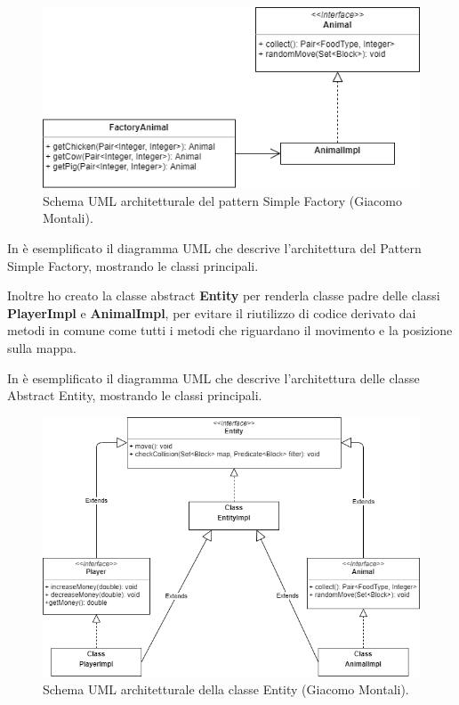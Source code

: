 \documentclass[a4paper,12pt]{report}
\begin{document}
\begin{figure}[!htb]
	\centering{}
	\includegraphics[width=\textwidth]{img/UML_FactoryMonta.png}
	\caption{Schema UML architetturale del pattern Simple Factory (Giacomo Montali).}
	\label{img:GiacomoMontali_Factory}
\end{figure}

In  è esemplificato il diagramma UML che descrive l'architettura del Pattern Simple Factory, mostrando le classi principali.

Inoltre ho creato la classe abstract \textbf{Entity} per renderla classe padre delle classi \textbf{PlayerImpl} e \textbf{AnimalImpl}, per evitare il riutilizzo di codice derivato dai metodi in comune come tutti i metodi che riguardano il movimento e la posizione sulla mappa.

In  è esemplificato il diagramma UML che descrive l'architettura delle classe Abstract Entity, mostrando le classi principali.

\hfill\break
\begin{figure}[!htb]
	\centering{}
	\includegraphics[width=\textwidth]{img/UML_AbstractMonta.png}
	\caption{Schema UML architetturale della classe Entity (Giacomo Montali).}
	\label{img:GiacomoMontali_Abstract}
\end{figure}
\end{document}
